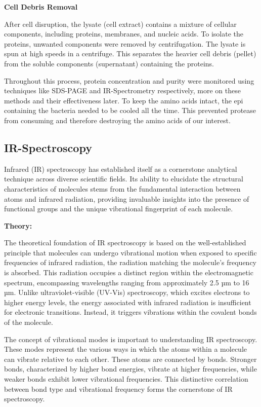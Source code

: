\textbf{Cell Debris Removal}

After cell disruption, the lysate (cell extract) contains a mixture of cellular components,
including proteins, membranes, and nucleic acids.
To isolate the proteins, unwanted components were removed by centrifugation.
The lysate is spun at high speeds in a centrifuge.
This separates the heavier cell debris (pellet) from the soluble components
(supernatant) containing the proteins.

Throughout this process, protein concentration and purity were monitored using techniques
like SDS-PAGE and IR-Spectrometry respectively, more on these methods and their
effectiveness later.
To keep the amino acids intact, the epi containing the bacteria needed to be cooled all the time.
This prevented protease from consuming and therefore destroying the amino acids of our interest.

\newpage

\subsection{IR-Spectroscopy}
Infrared (IR) spectroscopy has established itself as a cornerstone analytical technique across diverse scientific fields.
Its ability to elucidate the structural characteristics of molecules stems from the fundamental interaction between atoms and infrared radiation, providing invaluable insights into the presence of functional groups and the unique vibrational fingerprint of each molecule.

\textbf{Theory:}

The theoretical foundation of IR spectroscopy is based on the well-established principle that molecules can undergo vibrational motion when exposed to specific frequencies of infrared radiation, the radiation matching the molecule's frequency is absorbed.
This radiation occupies a distinct region within the electromagnetic spectrum, encompassing wavelengths ranging from approximately 2.5 µm to 16 µm.
Unlike ultraviolet-visible (UV-Vis) spectroscopy, which excites electrons to higher energy levels, the energy associated with infrared radiation is insufficient for electronic transitions.
Instead, it triggers vibrations within the covalent bonds of the molecule.

The concept of vibrational modes is important to understanding IR spectroscopy.
These modes represent the various ways in which the atoms within a molecule can vibrate relative to each other.
These atoms are connected by bonds.
Stronger bonds, characterized by higher bond energies, vibrate at higher frequencies, while weaker bonds exhibit lower vibrational frequencies.
This distinctive correlation between bond type and vibrational frequency forms the cornerstone of IR spectroscopy.

